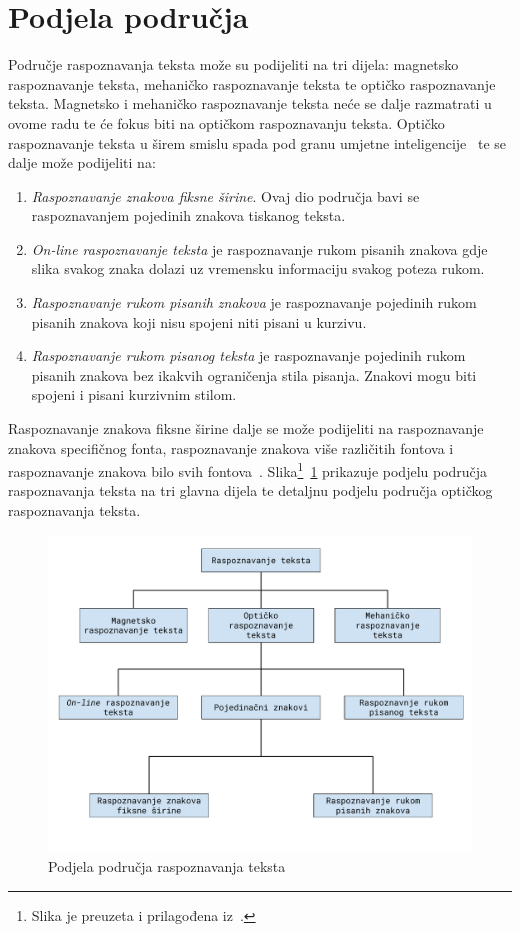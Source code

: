 \section{Podjela područja}
\label{sec:podjela-podrucja}
Područje raspoznavanja teksta može su podijeliti na tri dijela: magnetsko raspoznavanje teksta, mehaničko raspoznavanje
teksta te optičko raspoznavanje teksta. Magnetsko i mehaničko raspoznavanje teksta neće se dalje razmatrati u ovome
radu te će fokus biti na optičkom raspoznavanju teksta. Optičko raspoznavanje teksta u širem smislu spada pod granu
umjetne inteligencije\ \citep{mori1999} te se dalje može podijeliti na:
\begin{enumerate}
    \item \emph{Raspoznavanje znakova fiksne širine}. Ovaj dio područja bavi se raspoznavanjem pojedinih znakova
    tiskanog teksta.
    \item \emph{On-line raspoznavanje teksta} je raspoznavanje rukom pisanih znakova gdje slika svakog znaka dolazi uz
    vremensku informaciju svakog poteza rukom.
    \item \emph{Raspoznavanje rukom pisanih znakova} je raspoznavanje pojedinih rukom pisanih znakova koji nisu spojeni
    niti pisani u kurzivu.
    \item \emph{Raspoznavanje rukom pisanog teksta} je raspoznavanje pojedinih rukom pisanih znakova bez ikakvih
    ograničenja stila pisanja. Znakovi mogu biti spojeni i pisani kurzivnim stilom.
\end{enumerate}
Raspoznavanje znakova fiksne širine dalje se može podijeliti na raspoznavanje znakova specifičnog fonta, raspoznavanje
znakova više različitih fontova i raspoznavanje znakova bilo svih fontova\ \citep{govindan1989}.
Slika\footnote{Slika je preuzeta i prilagođena iz\ \citep{mantas1986}.}\ \ref{fig:podjela-podrucja-raspoznavanja-teksta}
prikazuje podjelu područja raspoznavanja teksta na tri glavna dijela te detaljnu podjelu područja optičkog raspoznavanja
teksta.

\begin{figure}[htb]
    \centering
    \includegraphics[width=12cm]{images/character-recognition-categories.pdf}
    \caption{Podjela područja raspoznavanja teksta}
    \label{fig:podjela-podrucja-raspoznavanja-teksta}
\end{figure}

